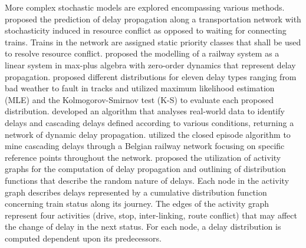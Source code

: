 \documentclass[]{interact}
\theoremstyle{plain}%
\theoremstyle{definition}
\theoremstyle{remark}
\begin{document}
More complex stochastic models are explored encompassing various methods. \cite{KHA16} proposed the prediction of delay propagation along a transportation network with stochasticity induced in resource conflict as opposed to waiting for connecting trains. Trains in the network are assigned static priority classes that shall be used to resolve resource conflict. \cite{COR09} proposed the modelling of a railway system as a linear system in max-plus algebra with zero-order dynamics that represent delay propagation. \cite{YAN19} proposed different distributions for eleven delay types ranging from bad weather to fault in tracks and utilized maximum likelihood estimation (MLE) and the Kolmogorov-Smirnov test (K-S) to evaluate each proposed distribution. \cite{SOR17} developed an algorithm that analyses real-world data to identify delays and cascading delays defined according to various conditions, returning a network of dynamic delay propagation. \cite{BOR11} utilized the closed episode algorithm to mine cascading delays through a Belgian railway network focusing on specific reference points throughout the network. \cite{BUK12} proposed the utilization of activity graphs for the computation of delay propagation and outlining of distribution functions that describe the random nature of delays. Each node in the activity graph describes delays represented by a cumulative distribution function concerning train status along its journey. The edges of the activity graph represent four activities (drive, stop, inter-linking, route conflict) that may affect the change of delay in the next status. For each node, a delay distribution is computed dependent upon its predecessors. 
\end{document}
